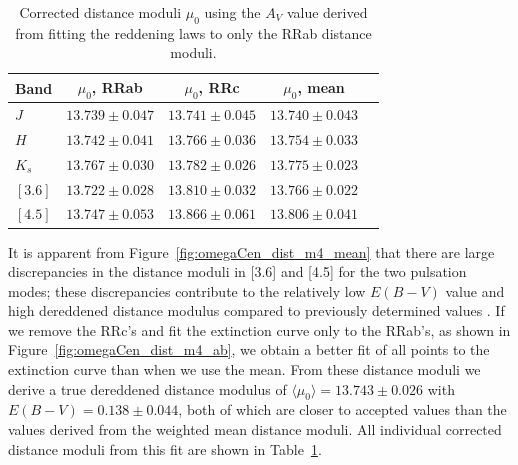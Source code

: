 \documentclass[a4paper,fleqn,usenatbib]{mnras}
\begin{document}
\endgroup

\begin{table}
\centering
\caption{Corrected distance moduli $\mu_0$ using the $A_V$ value derived from fitting the reddening laws to only the RRab distance moduli.}
\label{tab:dist_mod_ab}
\begin{tabular}{l||c|c|c|r} 
\hline \hline
Band & $\mu_0$, RRab & $\mu_0$, RRc & $\mu_0$, mean \\
\hline
$J$ & $13.739 \pm 0.047$ & $13.741 \pm 0.045$ & $13.740 \pm 0.043$ \\
$H$ & $13.742 \pm 0.041$ & $13.766 \pm 0.036$ & $13.754 \pm 0.033$ \\
$K_s$ & $13.767 \pm 0.030$ & $13.782 \pm 0.026$ & $13.775 \pm 0.023$ \\
$[3.6]$ & $13.722 \pm 0.028$ & $13.810 \pm 0.032$ & $13.766 \pm 0.022$ \\
$[4.5]$ & $13.747 \pm 0.053$ & $13.866 \pm 0.061$ & $13.806 \pm 0.041$ \\
\hline
\end{tabular}
\end{table}

It is apparent from Figure~\ref{fig:omegaCen_dist_m4_mean} that there are large discrepancies in the distance moduli in [3.6] and [4.5] for the two pulsation modes; these discrepancies contribute to the relatively low $E(B-V)$ value and high dereddened distance modulus compared to previously determined values \citep[e.g.][]{2002ASPC..265...95L, 2006ApJ...652..362D}. 
If we remove the RRc's and fit the extinction curve only to the RRab's, as shown in Figure~\ref{fig:omegaCen_dist_m4_ab}, we obtain a better fit of all points to the extinction curve than when we use the mean. From these distance moduli we derive a true dereddened distance modulus of $\langle \mu_0 \rangle = 13.743 \pm 0.026$ with $E(B-V) = 0.138 \pm 0.044$, both of which are closer to accepted values than the values derived from the weighted mean distance moduli. All individual corrected distance moduli from this fit are shown in Table~\ref{tab:dist_mod_ab}.
\end{document}
